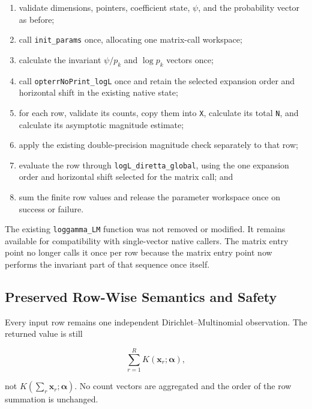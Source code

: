 \documentclass[11pt,a4paper]{article}
\begin{document}
\begin{enumerate}

\item validate dimensions, pointers, coefficient state, \(\psi\), and the
probability vector as before;

\item call \texttt{init\_params} once, allocating one matrix-call workspace;

\item calculate the invariant \(\psi/p_k\) and \(\log p_k\) vectors once;

\item call \texttt{opterrNoPrint\_logL} once and retain the selected expansion
order and horizontal shift in the existing native state;

\item for each row, validate its counts, copy them into \texttt{X}, calculate
its total \texttt{N}, and calculate its asymptotic magnitude estimate;

\item apply the existing double-precision magnitude check separately to that
row;

\item evaluate the row through \texttt{logL\_diretta\_global}, using the one
expansion order and horizontal shift selected for the matrix call; and

\item sum the finite row values and release the parameter workspace once on
success or failure.

\end{enumerate}

The existing \texttt{loggamma\_LM} function was not removed or modified. It
remains available for compatibility with single-vector native callers. The
matrix entry point no longer calls it once per row because the matrix entry
point now performs the invariant part of that sequence once itself.

\subsection{Preserved Row-Wise Semantics and Safety}

Every input row remains one independent Dirichlet--Multinomial observation.
The returned value is still

\[
\sum_{r=1}^{R} K(\mathbf{x}_r;\boldsymbol{\alpha}),
\]

not \(K(\sum_r\mathbf{x}_r;\boldsymbol{\alpha})\). No count vectors are
aggregated and the order of the row summation is unchanged.
\end{document}
